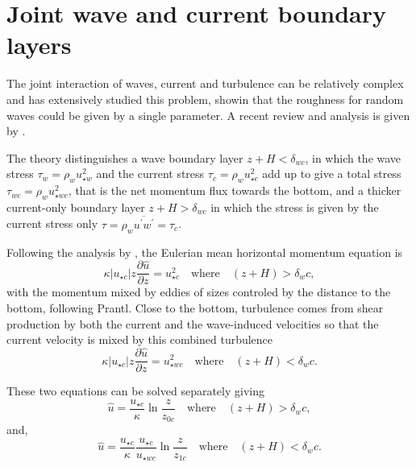 \section{Joint wave and current boundary layers}
The joint interaction of waves, current and turbulence can be relatively complex and \cite{Madsen1994} has extensively studied this problem, showin that the roughness for random waves could be given by a single parameter. A recent review and analysis is given by \cite{Zou2004}.

The theory distinguishes a wave boundary layer $z+H <
\delta_{wc}$, in which the wave stress  $\tau_{w}=\rho_w  u_{\star w}^2$ and the current stress 
$\tau_{c}=\rho_w u_{\star c}^2$  add up to give a total stress $\tau_{wc}=\rho_w
u_{\star wc}^2$, that is the net momentum flux towards the bottom, and a thicker current-only boundary layer  $z+H > \delta_{wc}$ in which the stress is given by the current stress only  $\tau=\rho_w
\overline{u^\prime w^\prime}=\tau_{c}$.

Following the analysis by \cite{Grant&Madsen1979}, the Eulerian mean  horizontal momentum equation is 
\begin{equation}
\kappa \left|u_{\star c}\right| z \frac{\partial \widehat{u}}{\partial z} =
u_{\star c}^2  \quad \textrm{where} \quad \left(z+H\right) > \delta_wc,
\end{equation}
with the momentum mixed by eddies of sizes controled by the distance to the bottom, following  Prantl. 
Close to the bottom, turbulence comes from shear production by both the current and the wave-induced velocities so that 
the current velocity is mixed by this combined turbulence 
\begin{equation}
\kappa \left|u_{\star c}\right| z \frac{\partial \widehat{u}}{\partial z} =
u_{\star wc}^2  \quad \textrm{where} \quad \left(z+H\right) < \delta_wc.
\label{curr_wbbl}
\end{equation}


These two equations can be solved separately giving 
\begin{equation}
\widehat{u} =\frac{u_{\star c}}{\kappa} \ln \frac{z}{z_{0c}} 
\quad \textrm{where} \quad \left(z+H\right) > \delta_wc,
\end{equation}
and,
\begin{equation}
\widehat{u} =\frac{u_{\star c}}{\kappa} \frac{u_{\star c}}{u_{\star wc}} \ln
\frac{z}{z_{1c}}  \quad \textrm{where} \quad \left(z+H\right) <
\delta_wc.
\end{equation}

